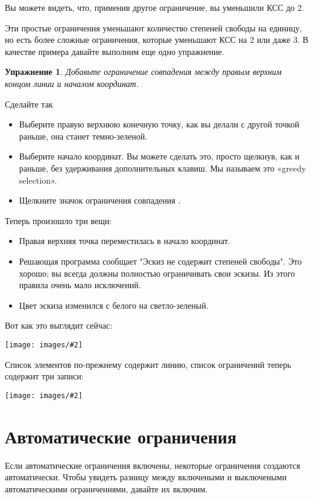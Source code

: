 \documentclass[12pt,titlepage]{article}
\newcommand{\icon}[1]{\raisebox{-1em}{\rule{0pt}{27pt}\texttt{[image: images/\#1]}}}
\newcommand{\img}[2]{\vspace{2ex}\noindent\texttt{[image: images/\#2]}}
\newtheorem{Exercise}{Упражнение}
\begin{document}
Вы можете видеть, что, применив другое ограничение, вы уменьшили КСС до 2.

Эти простые ограничения уменьшают количество степеней свободы на единицу, но есть более сложные ограничения, которые уменьшают КСС на 2 или даже 3. В качестве примера давайте выполним еще одно упражнение.

\begin{Exercise}
\label{ExerciseCoincidence}
Добавьте ограничение совпадения между правым верхним концом линии и началом координат.
\end{Exercise}

Сделайте так
\begin{itemize}
\item Выберите правую верхнюю конечную точку, как вы делали с другой точкой раньше, она станет темно-зеленой.
\item Выберите начало координат. Вы можете сделать это, просто щелкнув, как и раньше, без удерживания дополнительных клавиш. Мы называем это «greedy selection».
\item Щелкните значок ограничения совпадения \icon {Constraint_PointOnPoint}.
\end{itemize}

Теперь произошло три вещи:
\begin{itemize}
\item Правая верхняя точка переместилась в начало координат.
\item Решающая программа сообщает "Эскиз не содержит степеней свободы". Это хорошо; вы всегда должны полностью ограничивать свои эскизы. Из этого правила очень мало исключений.
\item Цвет эскиза изменился с белого на светло-зеленый.
\end{itemize}

Вот как это выглядит сейчас:

\img{width=8cm}{Fully1}

\label{ListOfElements2}Список элементов по-прежнему содержит линию, список ограничений теперь содержит три записи:

\img{}{Constraints2}

\section{Автоматические ограничения}
Если автоматические ограничения включены, некоторые ограничения создаются автоматически. Чтобы увидеть разницу между включеными и выключеными автоматическими ограничениями, давайте их включим.
\end{document}
